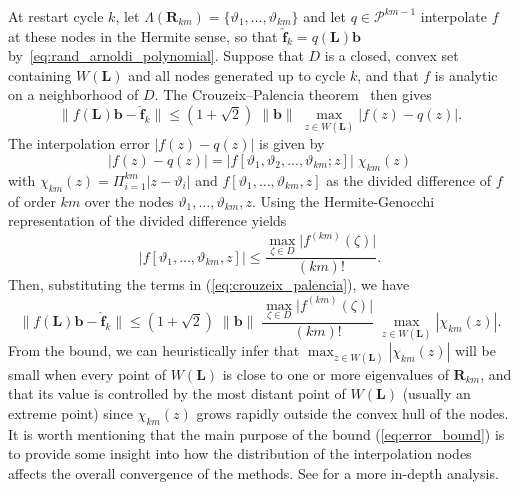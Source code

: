 \documentclass[smallextended]{svjour3}
\renewcommand{\vec}[1]{\mathbf{#1}}
\newcommand{\mat}[1]{\mathbf{#1}}
\newcommand{\norm}[1]{\| #1 \|}
\begin{document}
At restart cycle $k$, let $\Lambda(\mat{R}_{km}) = \{\vartheta_1,\ldots,\vartheta_{km}\}$ and let $q \in \mathcal{P}^{km-1}$ interpolate $f$ at these nodes in the Hermite sense, so that $\vec{\hat{f}}_k = q(\mat{L})\vec{b}$ by~\eqref{eq:rand_arnoldi_polynomial}. Suppose that $D$ is a closed, convex set containing $W(\mat{L})$ and all nodes generated up to cycle $k$, and that $f$ is analytic on a neighborhood of $D$. The Crouzeix--Palencia theorem~\cite{crouzeix_numerical_2017} then gives
\begin{equation}
\label{eq:crouzeix_palencia}
\norm{f(\mat{L})\vec{b} - \vec{\hat{f}}_k} \leq (1 + \sqrt{2}) \; \norm{\vec{b}} \; \max_{z \in W(\mat{L})} |f(z) - q(z)|.
\end{equation}
The interpolation error $|f(z) - q(z)|$ is given by
\begin{equation*}
|f(z) - q(z)| = |f[\vartheta_1, \vartheta_2, ..., \vartheta_{km}; z]| \; \chi_{km}(z)
\end{equation*}
with $\chi_{km}(z) = \Pi_{i = 1}^{km} |z - \vartheta_i|$ and $f[\vartheta_1, \ldots, \vartheta_{km}, z]$ as the divided difference of $f$ of order $km$ over the nodes $\vartheta_1, \ldots, \vartheta_{km}, z$. Using the Hermite-Genocchi representation of the divided difference \cite{palitta_sketched_2025,de_boor_divided_2005} yields
\begin{equation*}
\bigl| f[\vartheta_1,\ldots,\vartheta_{km},z] \bigr| \leq \frac{\max_{\zeta \in D} \bigl| f^{(km)}(\zeta) \bigr|}{(km)!}.
\end{equation*}
Then, substituting the terms in (\ref{eq:crouzeix_palencia}), we have
\begin{equation}
\label{eq:error_bound}
\norm{f(\mat{L})\vec{b} - \vec{\hat{f}}_k} \leq (1 + \sqrt{2}) \; \norm{\vec{b}} \; \frac{\max_{\zeta \in D} \bigl| f^{(km)}(\zeta) \bigr|}{(km)!} \; \max_{z \in W(\mat{L})} |\chi_{km}(z)|.
\end{equation}
From the bound, we can heuristically infer that $\max_{z \in W(\mat{L})} |\chi_{km}(z)|$ will be small when every point of $W(\mat{L})$ is close to one or more eigenvalues of $\mat{R}_{km}$, and that its value is controlled by the most distant point of $W(\mat{L})$ (usually an extreme point) since $\chi_{km}(z)$ grows rapidly outside the convex hull of the nodes. It is worth mentioning that the main purpose of the bound (\ref{eq:error_bound}) is to provide some insight into how the distribution of the interpolation nodes affects the overall convergence of the methods. See \cite{eiermann_analysis_2000,eiermann_restarted_2006,frommer_convergence_2014,palitta_sketched_2025} for a more in-depth analysis.
\end{document}
